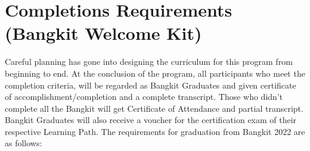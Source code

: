 {

\section*{Completions Requirements (Bangkit Welcome Kit)}

Careful planning has gone into designing the curriculum for this program from beginning to end. At the conclusion of the program, all participants who meet the completion criteria, will be regarded as Bangkit Graduates and given certificate of accomplishment/completion and a complete transcript. Those who didn’t complete all the Bangkit will get Certificate of Attendance and partial transcript. Bangkit Graduates will also receive a voucher for the certification exam of their respective Learning Path. The requirements for graduation from Bangkit 2022 are as follows:


}
